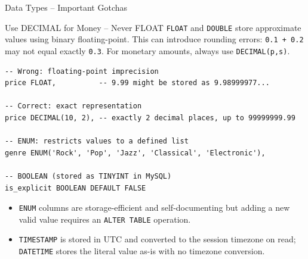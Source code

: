 \begin{frame}[fragile]{Data Types -- Important Gotchas}
  \begin{alertblock}{Use DECIMAL for Money -- Never FLOAT}
    \texttt{FLOAT} and \texttt{DOUBLE} store approximate values using binary floating-point.
    This can introduce rounding errors: \texttt{0.1 + 0.2} may not equal exactly \texttt{0.3}.
    For monetary amounts, always use \texttt{DECIMAL(p,s)}.
  \end{alertblock}

  \begin{lstlisting}[style=sqlstyle]
-- Wrong: floating-point imprecision
price FLOAT,          -- 9.99 might be stored as 9.98999977...

-- Correct: exact representation
price DECIMAL(10, 2), -- exactly 2 decimal places, up to 99999999.99

-- ENUM: restricts values to a defined list
genre ENUM('Rock', 'Pop', 'Jazz', 'Classical', 'Electronic'),

-- BOOLEAN (stored as TINYINT in MySQL)
is_explicit BOOLEAN DEFAULT FALSE
  \end{lstlisting}

  \begin{itemize}
    \item \texttt{ENUM} columns are storage-efficient and self-documenting but adding a new
          valid value requires an \texttt{ALTER TABLE} operation.
    \item \texttt{TIMESTAMP} is stored in UTC and converted to the session timezone on read;
          \texttt{DATETIME} stores the literal value as-is with no timezone conversion.
  \end{itemize}
\end{frame}

